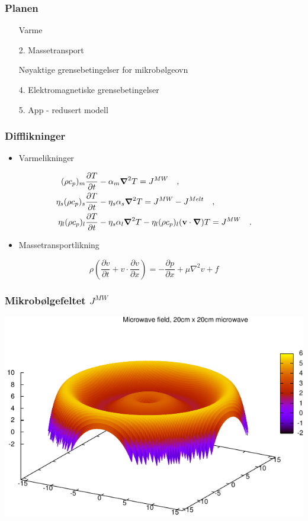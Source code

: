 \documentclass[screen]{beamer}
\renewcommand{\v}[1]{\ensuremath{\mathbf{#1}}} %
\newcommand{\gv}[1]{\ensuremath{\mbox{\boldmath$ #1 $}}}
\newcommand{\pd}[2]{\frac{\partial #1}{\partial #2}}
\newcommand{\grad}[1]{\gv{\nabla} #1} %
\newcommand{\checktick}{\textcolor{green}{\checked}}
\begin{document}
\begin{frame}
  \frametitle{Planen}
  \begin{enumerate}
  \item[\checktick] Varme
  \item[2.] Massetransport
  \item[\checktick] Nøyaktige grensebetingelser for mikrobølgeovn
\end{enumerate}
    \hline
\begin{enumerate}
  \item[4.] Elektromagnetiske grensebetingelser
  \item[5.] App - redusert modell
  \end{enumerate}
\end{frame}

\begin{frame}
\frametitle{Difflikninger}
\begin{itemize}
  \item Varmelikninger
\end{itemize}
\begin{align*}
  \label{eq:temp}
  (\rho c_p)_m \pd{T}{t} &- \alpha_m \grad{^2 T} = J^{MW} \quad \rm{,} \\
  \eta_s (\rho c_p)_s \pd{T}{t} &- \eta_s\alpha_s \grad{^2 T} = J^{MW} - J^{Melt}  \quad \rm{,} \\
  \eta_l (\rho c_p)_l \pd{T}{t} &- \eta_s\alpha_l \grad{^2 T} - \eta_l(\rho c_p)_l(\v{v}\cdot
  \grad{})T = J^{MW}  \quad \rm{.}
\end{align*}
\begin{itemize}
  \item Massetransportlikning
\end{itemize}
\begin{equation*}
  \rho \left(\pd{v}{t} + v \cdot \pd{v}{x}\right) = -\pd{p}{x} + \mu \nabla^2 v + f
 \label{eq:navier-stokes}
\end{equation*}
\end{frame}

\begin{frame}
  \frametitle{Mikrobølgefeltet $J^{MW}$}
  \hspace{20pt}
      \includegraphics[width=0.8\linewidth]{microwave.pdf}
\end{frame}
\end{document}

